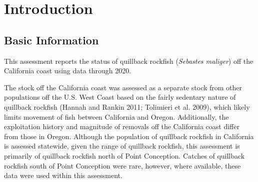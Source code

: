 \documentclass[11pt,
  english,
  letterpaper,
]{article}
\begin{document}
\newcommand{\lt}{\ensuremath <}
\newcommand{\gt}{\ensuremath >}

\setcounter{page}{1}

\renewcommand{\thetable}{\roman{table}}
\renewcommand{\thefigure}{\roman{figure}}

\setlength\parskip{0.5em plus 0.1em minus 0.2em}

\vspace{500cm}

\pagebreak

\pagebreak
{}
\setcounter{page}{1}
\renewcommand{\thefigure}{\arabic{figure}}
\renewcommand{\thetable}{\arabic{table}}
\setcounter{table}{0}
\setcounter{figure}{0}


\hypertarget{introduction}{%
\section{Introduction}\label{introduction}}

\leavevmode\tagmcend\tagstructend


\hypertarget{basic-information}{%
\subsection{Basic Information}\label{basic-information}}

\leavevmode\tagmcend\tagstructend


This assessment reports the status of quillback rockfish (\emph{Sebastes maliger}) off the California coast using data through 2020.

\leavevmode\tagmcend\tagstructend\par


The stock off the California coast was assessed as a separate stock from other populations off the U.S. West Coast based on the fairly sedentary nature of quillback rockfish {(Hannah and Rankin 2011; Tolimieri et al. 2009)\leavevmode\tagmcend\tagstructend}, which likely limits movement of fish between California and Oregon. Additionally, the exploitation history and magnitude of removals off the California coast differ from those in Oregon. Although the population of quillback rockfish in California is assessed statewide, given the range of quillback rockfish, this assessment is primarily of quillback rockfish north of Point Conception. Catches of quillback rockfish south of Point Conception were rare, however, where available, these data were used within this assessment.
\end{document}
